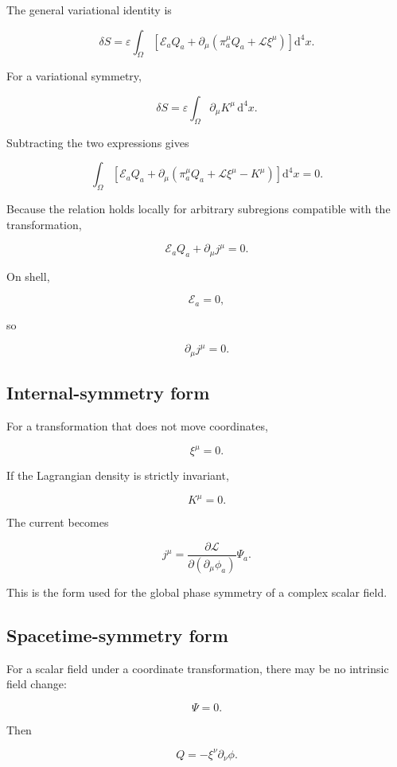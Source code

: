 The general variational identity is

\[
\delta S
=
\varepsilon
\int_{\Omega}
\left[
\mathcal{E}_aQ_a
+
\partial_{\mu}
\left(
\pi_a^{\mu}Q_a
+
\mathcal{L}\xi^{\mu}
\right)
\right]
\mathrm{d}^{4}x.
\]

For a variational symmetry,

\[
\delta S
=
\varepsilon
\int_{\Omega}
\partial_{\mu}K^{\mu}
\,\mathrm{d}^{4}x.
\]

Subtracting the two expressions gives

\[
\int_{\Omega}
\left[
\mathcal{E}_aQ_a
+
\partial_{\mu}
\left(
\pi_a^{\mu}Q_a
+
\mathcal{L}\xi^{\mu}
-
K^{\mu}
\right)
\right]
\mathrm{d}^{4}x
=
0.
\]

Because the relation holds locally for arbitrary subregions compatible with the transformation,

\[
\mathcal{E}_aQ_a
+
\partial_{\mu}j^{\mu}
=
0.
\]

On shell,

\[
\mathcal{E}_a=0,
\]

so

\[
\partial_{\mu}j^{\mu}=0.
\]

\subsection{Internal-symmetry form}

For a transformation that does not move coordinates,

\[
\xi^{\mu}=0.
\]

If the Lagrangian density is strictly invariant,

\[
K^{\mu}=0.
\]

The current becomes

\[
\boxed{
j^{\mu}
=
\frac{\partial\mathcal{L}}
{\partial(\partial_{\mu}\phi_a)}
\Psi_a
}.
\]

This is the form used for the global phase symmetry of a complex scalar field.

\subsection{Spacetime-symmetry form}

For a scalar field under a coordinate transformation, there may be no intrinsic field change:

\[
\Psi=0.
\]

Then

\[
Q
=
-\xi^{\nu}\partial_{\nu}\phi.
\]

